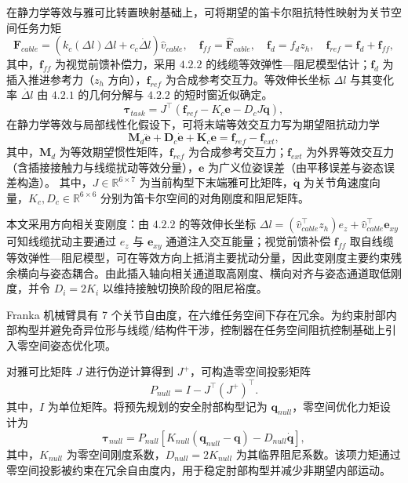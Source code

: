在静力学等效与雅可比转置映射基础上，可将期望的笛卡尔阻抗特性映射为关节空间任务力矩
\begin{equation}
\widehat{\mathbf{F}}_{cable}=\left(k_c(\Delta l)\Delta l+c_c\dot{\Delta l}\right)\hat v_{cable},\quad
\mathbf{f}_{ff}=\widehat{\mathbf{F}}_{cable},\quad
\mathbf{f}_{d}=f_{d}z_{h},\quad
\mathbf{f}_{ref}=\mathbf{f}_{d}+\mathbf{f}_{ff},
\end{equation}
其中，$\mathbf{f}_{ff}$ 为视觉前馈补偿力，采用 $4.2.2$ 的线缆等效弹性—阻尼模型估计；$\mathbf{f}_{d}$ 为插入推进参考力（$z_h$ 方向），$\mathbf{f}_{ref}$ 为合成参考交互力。等效伸长坐标 $\Delta l$ 与其变化率 $\dot{\Delta l}$ 由 $4.2.1$ 的几何分解与 $4.2.2$ 的短时窗近似确定。
\begin{equation}
\boldsymbol{\tau}_{task}=J^{\top}\left(\mathbf{f}_{ref}-K_{c}\mathbf{e}-D_{c}J\dot{\mathbf{q}}\right),
\end{equation}
在静力学等效与局部线性化假设下，可将末端等效交互力写为期望阻抗动力学
$$
\mathbf{M}_{d}\ddot{\mathbf{e}}+\mathbf{D}_{c}\dot{\mathbf{e}}+\mathbf{K}_{c}\mathbf{e}=\mathbf{f}_{ref}-\mathbf{f}_{ext},
$$
其中，$\mathbf{M}_d$ 为等效期望惯性矩阵，$\mathbf{f}_{ref}$ 为合成参考交互力；$\mathbf{f}_{ext}$ 为外界等效交互力（含插接接触力与线缆扰动等效分量），$\mathbf{e}$ 为广义位姿误差（由平移误差与姿态误差构造）。
其中，$J\in\mathbb{R}^{6\times 7}$ 为当前构型下末端雅可比矩阵，$\dot{\mathbf{q}}$ 为关节角速度向量，$K_{c},D_{c}\in\mathbb{R}^{6\times 6}$ 分别为笛卡尔空间的对角刚度和阻尼矩阵。

本文采用方向相关变刚度：由 $4.2.2$ 的等效伸长坐标
$\Delta l=\left(\hat v_{cable}^{\top}z_{h}\right)e_{z}+\hat v_{cable}^{\top}\mathbf{e}_{xy}$ 可知线缆扰动主要通过 $e_z$ 与 $\mathbf{e}_{xy}$ 通道注入交互能量；视觉前馈补偿 $\mathbf{f}_{ff}$ 取自线缆等效弹性—阻尼模型，可在等效方向上抵消主要扰动分量，因此变刚度主要约束残余横向与姿态耦合。由此插入轴向相关通道取高刚度、横向对齐与姿态通道取低刚度，并令 $D_i=2K_i$ 以维持接触切换阶段的阻尼裕度。


Franka 机械臂具有 7 个关节自由度，在六维任务空间下存在冗余。为约束肘部内部构型并避免奇异位形与线缆/结构件干涉，控制器在任务空间阻抗控制基础上引入零空间姿态优化项。

对雅可比矩阵 $J$ 进行伪逆计算得到 $J^{+}$，可构造零空间投影矩阵
\begin{equation}
P_{null}=I-J^{\top}(J^{+})^{\top}.
\end{equation}
其中，$I$ 为单位矩阵。将预先规划的安全肘部构型记为 $\mathbf{q}_{null}$，零空间优化力矩设计为
\begin{equation}
\boldsymbol{\tau}_{null}=P_{null}\left[K_{null}(\mathbf{q}_{null}-\mathbf{q})-D_{null}\dot{\mathbf{q}}\right],
\end{equation}
其中，$K_{null}$ 为零空间刚度系数，$D_{null}=2K_{null}$ 为其临界阻尼系数。该项力矩通过零空间投影被约束在冗余自由度内，用于稳定肘部构型并减少非期望内部运动。

